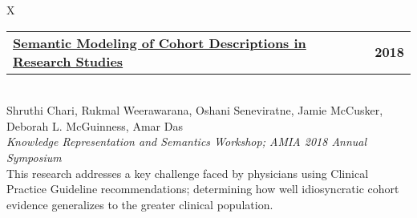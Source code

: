 \documentclass[10pt]{article}
\newcommand{\tabularxwidth}{\textwidth}
\newcommand{\changeurlcolor}[1]{\hypersetup{urlcolor=#1}}
\begin{document}
        \begin{minipage}{\tabularxwidth}
        \begin{tabularx}{\tabularxwidth}{X}
            {
                \begin{tabularx}{\tabularxwidth}{@{}X r}
                    \textbf{\changeurlcolor{black}\href{https://tw.rpi.edu/web/doc/semantic_modeling_of_cohort}{Semantic Modeling of Cohort Descriptions in Research Studies}} &
                    \textbf{
        2018} \\
                \end{tabularx}
            } \\
            Shruthi Chari, Rukmal Weerawarana, Oshani Seneviratne, Jamie McCusker, Deborah L. McGuinness, Amar Das \\

            
                \textit{Knowledge Representation and Semantics Workshop; AMIA 2018 Annual Symposium} \\
            
            

            
    This research addresses a key challenge faced by physicians using Clinical Practice Guideline recommendations; determining how well idiosyncratic cohort evidence generalizes to the greater clinical population.
        \end{tabularx}

        
            \vspace{.3em}
        

        \end{minipage}
    
\end{document}
